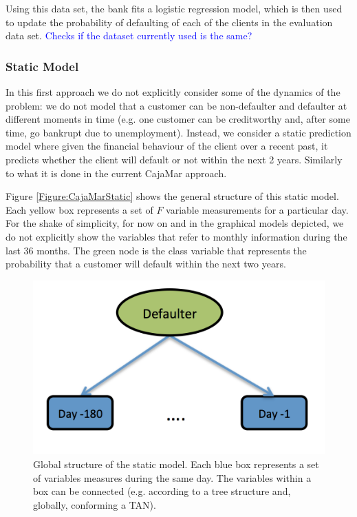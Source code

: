 \begin{itemize}
Using this data set, the bank fits a logistic regression model, which is then used to update the probability of defaulting of each of the clients in the evaluation data set. \textcolor{blue}{Checks if the dataset currently used is the same?}

\end{itemize}




\subsubsection*{Static Model} 

In this first approach we do not explicitly consider some of the dynamics of the problem: we do not model that a customer can be non-defaulter and defaulter at different moments in time (e.g. one customer can be creditworthy and, after some time, go bankrupt due to unemployment). Instead, we consider a static prediction model where given the financial behaviour of the client over a recent past, it predicts whether the client will default or not within the next 2 years. Similarly to what it is done in the current CajaMar approach. 

Figure \ref{Figure:CajaMarStatic} shows the general structure of this static model. Each yellow box represents a set of $F$ variable measurements for a particular day.
For the shake of simplicity, for now on and in the graphical models depicted, we do not explicitly show the variables that refer to monthly information during the last 36 months. The green node is the class variable that represents the probability that a customer will default within the next two years. 

\begin{figure}
\begin{center}
\includegraphics[scale=0.45]{./figures/CajaMarModel0}
\caption{\label{Figure:CajaMarStatic}Global structure of the static model. Each blue box represents a set of variables measures during the same day.
The variables within a box can be connected (e.g. according to a tree structure and, globally, conforming a TAN).}
\label{fig:static}
\end{center}
\end{figure}

